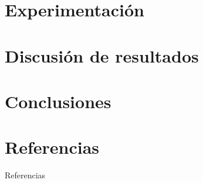 \documentclass{beamer}
\begin{document}
\section{Experimentación}

\section{Discusión de resultados}

\begin{frame}
	\cite{nofreelunch}
\end{frame}

\section{Conclusiones}

\section{Referencias}

\begin{frame}[allowframebreaks]{Referencias}
	
	
\end{frame}
\end{document}
